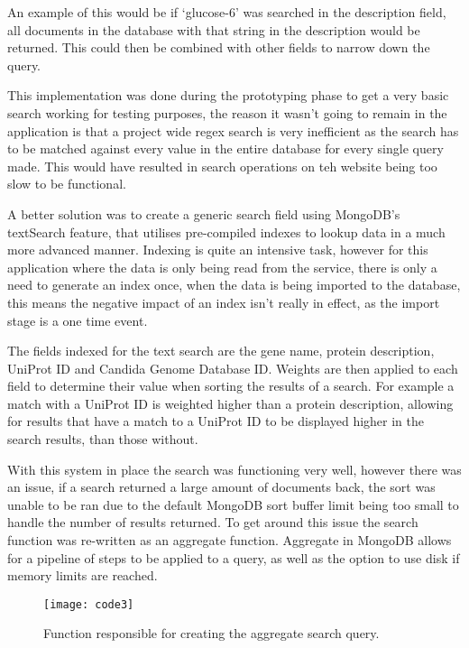 An example of this would be if `glucose-6' was searched in the description field, all documents in the database with that string in the description would be returned. This could then be combined with other fields to narrow down the query. 

This implementation was done during the prototyping phase to get a very basic search working for testing purposes, the reason it wasn't going to remain in the application is that a project wide regex search is very inefficient as the search has to be matched against every value in the entire database for every single query made. This would have resulted in search operations on teh website being too slow to be functional.

A better solution was to create a generic search field using MongoDB's textSearch\cite{textsearch} feature, that utilises pre-compiled indexes to lookup data in a much more advanced manner. Indexing is quite an intensive task, however for this application where the data is only being read from the service, there is only a need to generate an index once, when the data is being imported to the database, this means the negative impact of an index isn't really in effect, as the import stage is a one time event. 

The fields indexed for the text search are the gene name, protein description, UniProt ID and Candida Genome Database ID. Weights are then applied to each field to determine their value when sorting the results of a search. For example a match with a UniProt ID is weighted higher than a protein description, allowing for results that have a match to a UniProt ID to be displayed higher in the search results, than those without.

With this system in place the search was functioning very well, however there was an issue, if a search returned a large amount of documents back, the sort was unable to be ran due to the default MongoDB sort buffer limit being too small to handle the number of results returned. To get around this issue the search function was re-written as an aggregate function. Aggregate\cite{aggregate} in MongoDB allows for a pipeline of steps to be applied to a query, as well as the option to use disk if memory limits are reached. 

\begin{figure}[H]
\begin{center}
\texttt{[image: code3]}
\caption{Function responsible for creating the aggregate search query. \label{overflow}}
\end{center}
\end{figure}


